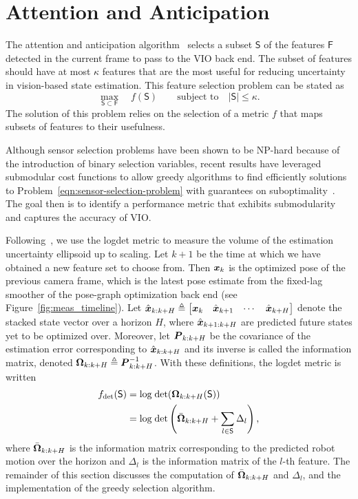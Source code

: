
\section{Attention and Anticipation}\label{sec:anticipation}

The attention and anticipation algorithm~\cite{Carlone2017} selects a subset $\mathsf{S}$ of the features $\mathsf{F}$ detected in the current frame to pass to the VIO back end.
The subset of features should have at most $\kappa$ features that are the most useful for reducing uncertainty in vision-based state estimation.
This feature selection problem can be stated as
\begin{equation}\label{eqn:sensor-selection-problem}
\max_{\mathsf{S}\subset\mathsf{F}} \quad f(\mathsf{S}) \qquad \text{subject to}\quad |\mathsf{S}|\le\kappa.
\end{equation}
The solution of this problem relies on the selection of a metric $f$ that maps subsets of features to their usefulness.

Although sensor selection problems have been shown to be NP-hard because of the introduction of binary selection variables, recent results have leveraged submodular cost functions to allow greedy algorithms to find efficiently solutions to Problem~\eqref{eqn:sensor-selection-problem} with guarantees on suboptimality~\cite{Shamaiah2010}.
The goal then is to identify a performance metric that exhibits submodularity and captures the accuracy of VIO.

Following~\cite{Carlone2017}, we use the logdet metric to measure the volume of the estimation uncertainty ellipsoid up to scaling.
Let $k+1$ be the time at which we have obtained a new feature set to choose from.
Then $\boldsymbol x_k$ is the optimized pose of the previous camera frame, which is the latest pose estimate from the fixed-lag smoother of the pose-graph optimization back end (see Figure~\ref{fig:meas_timeline}).
Let $\hat{\boldsymbol x}_{k:k+H}\triangleq\begin{bmatrix}\boldsymbol x_k&\hat{\boldsymbol x}_{k+1}&\cdots&\hat{\boldsymbol x}_{k+H}\end{bmatrix}$ denote the stacked state vector over a horizon $H$, where $\hat{\boldsymbol x}_{k+1:k+H}$ are predicted future states yet to be optimized over.
Moreover, let ${\boldsymbol P}_{k:k+H}$ be the covariance of the estimation error corresponding to $\hat{\boldsymbol x}_{k:k+H}$ and its inverse is called the information matrix, denoted ${\boldsymbol \Omega}_{k:k+H}\triangleq{\boldsymbol P}_{k:k+H}^{-1}$.
With these definitions, the logdet metric is written
\begin{align}
f_\text{det}(\mathsf{S}) &= \text{log}\;\text{det}({\boldsymbol \Omega}_{k:k+H}(\mathsf{S}))\\
&= \text{log}\;\text{det}\left(\bar{\boldsymbol \Omega}_{k:k+H} + \sum_{l\in\mathsf{S}}\Delta_l\right),
\end{align}
where $\bar{\boldsymbol \Omega}_{k:k+H}$ is the information matrix corresponding to the predicted robot motion over the horizon and $\Delta_l$ is the information matrix of the $l$-th feature.
The remainder of this section discusses the computation of $\bar{\boldsymbol \Omega}_{k:k+H}$ and $\Delta_l$, and the implementation of the greedy selection algorithm.

